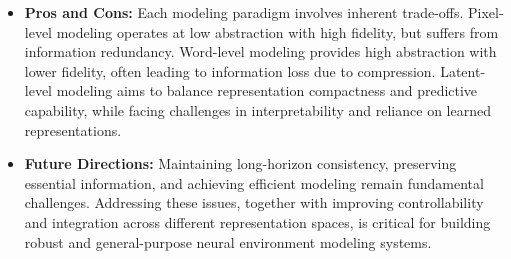 \begin{tcolorbox}[takeaway,title={Takeaway 5.2}]
\begin{itemize}
\item \textbf{Pros and Cons:} Each modeling paradigm involves inherent trade-offs.
Pixel-level modeling operates at low abstraction with high fidelity, but suffers from information redundancy. 
Word-level modeling provides high abstraction with lower fidelity, often leading to information loss due to compression. 
Latent-level modeling aims to balance representation compactness and predictive capability, while facing challenges in interpretability and reliance on learned representations.

\item \textbf{Future Directions:} Maintaining long-horizon consistency, preserving essential information, and achieving efficient modeling remain fundamental challenges. Addressing these issues, together with improving controllability and integration across different representation spaces, is critical for building robust and general-purpose neural environment modeling systems.
\end{itemize}
\end{tcolorbox}
\renewcommand{\arraystretch}{1.5} 
